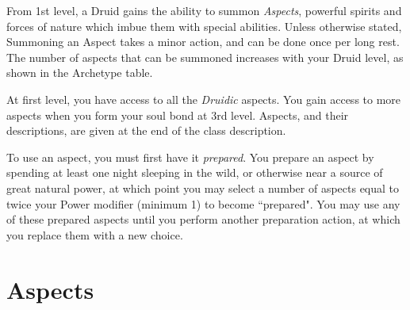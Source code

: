 
From 1st level, a Druid gains the ability to summon {\it Aspects}, powerful spirits and forces of nature which imbue them with special abilities. Unless otherwise stated, Summoning an Aspect takes a minor action, and can be done once per long rest. The number of aspects that can be summoned increases with your Druid level, as shown in the Archetype table. 

At first level, you have access to all the {\it Druidic} aspects. You gain access to more aspects when you form your soul bond at 3rd level. Aspects, and their descriptions, are given at the end of the class description. 

To use an aspect, you must first have it {\it prepared}. You prepare an aspect by spending at least one night sleeping in the wild, or otherwise near a source of great natural power, at which point you may select a number of aspects equal to twice your Power modifier (minimum 1) to become ``prepared". You may use any of these prepared aspects until you perform another preparation action, at which you replace them with a new choice.




\section*{Aspects}

 

 
